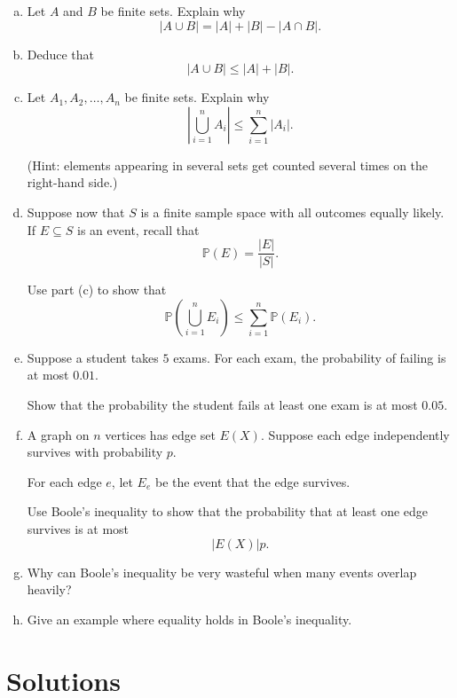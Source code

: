 \documentclass[12pt]{article}
\begin{document}
\begin{enumerate}[(a)]

\item Let $A$ and $B$ be finite sets.
Explain why
\[
|A\cup B|
=
|A|+|B|-|A\cap B|.
\]

\item Deduce that
\[
|A\cup B|
\leq
|A|+|B|.
\]

\item Let $A_1,A_2,\dots,A_n$ be finite sets.
Explain why
\[
\left|\bigcup_{i=1}^n A_i\right|
\leq
\sum_{i=1}^n |A_i|.
\]

(Hint: elements appearing in several sets get counted several times on the right-hand side.)

\item Suppose now that $S$ is a finite sample space with all outcomes equally likely.
If $E\subseteq S$ is an event, recall that
\[
\mathbb{P}(E)=\frac{|E|}{|S|}.
\]

Use part (c) to show that
\[
\mathbb{P}\left(\bigcup_{i=1}^n E_i\right)
\leq
\sum_{i=1}^n \mathbb{P}(E_i).
\]

\item Suppose a student takes $5$ exams.
For each exam, the probability of failing is at most $0.01$.

Show that the probability the student fails at least one exam is at most $0.05$.

\item A graph on $n$ vertices has edge set $E(X)$.
Suppose each edge independently survives with probability $p$.

For each edge $e$, let $E_e$ be the event that the edge survives.

Use Boole's inequality to show that the probability that at least one edge survives is at most
\[
|E(X)|p.
\]

\item Why can Boole's inequality be very wasteful when many events overlap heavily?

\item Give an example where equality holds in Boole's inequality.

\end{enumerate}

\newpage
\section*{Solutions}
\end{document}
